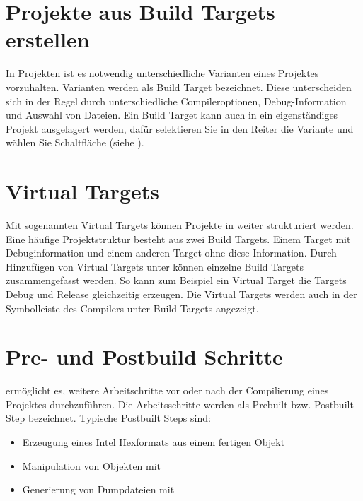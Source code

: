 
\section{Projekte aus Build Targets erstellen}

In Projekten ist es notwendig unterschiedliche Varianten eines Projektes vorzuhalten. Varianten werden als Build Target bezeichnet. Diese unterscheiden sich in der Regel durch unterschiedliche Compileroptionen, Debug-Information und Auswahl von Dateien. Ein Build Target kann auch in ein eigenständiges Projekt ausgelagert werden, dafür selektieren Sie in  den Reiter  die Variante und wählen Sie Schaltfläche  (siehe ).


\section{Virtual Targets}

Mit sogenannten Virtual Targets können Projekte in \codeblocks weiter strukturiert werden. Eine häufige Projektstruktur besteht aus zwei Build Targets. Einem Target  mit Debuginformation und einem anderen Target  ohne diese Information. Durch Hinzufügen von Virtual Targets unter  können einzelne Build Targets zusammengefasst werden. So kann zum Beispiel ein Virtual Target  die Targets Debug und Release gleichzeitig erzeugen. Die Virtual Targets werden auch in der Symbolleiste des Compilers unter Build Targets angezeigt.

\section{Pre- und Postbuild Schritte}\label{sec:pre_postbuild}

\codeblocks ermöglicht es, weitere Arbeitschritte vor oder nach der Compilierung eines Projektes durchzuführen. Die Arbeitsschritte werden als Prebuilt bzw. Postbuilt Step bezeichnet. Typische Postbuilt Steps sind:

\begin{itemize}
\item Erzeugung eines Intel Hexformats aus einem fertigen Objekt
\item Manipulation von Objekten mit 
\item Generierung von Dumpdateien mit 
\end{itemize}


